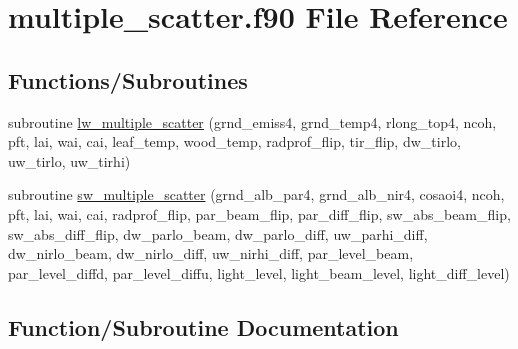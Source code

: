 \hypertarget{multiple__scatter_8f90}{}\section{multiple\+\_\+scatter.\+f90 File Reference}
\label{multiple__scatter_8f90}
\subsection*{Functions/\+Subroutines}
\begin{DoxyCompactItemize}
\item 
subroutine \hyperlink{multiple__scatter_8f90_a1369accc1269c7a9e612daad70493bc4}{lw\+\_\+multiple\+\_\+scatter} (grnd\+\_\+emiss4, grnd\+\_\+temp4, rlong\+\_\+top4, ncoh, pft, lai, wai, cai, leaf\+\_\+temp, wood\+\_\+temp, radprof\+\_\+flip, tir\+\_\+flip, dw\+\_\+tirlo, uw\+\_\+tirlo, uw\+\_\+tirhi)
\item 
subroutine \hyperlink{multiple__scatter_8f90_a6388f60b78ad37f8864f30cfd6a3cf62}{sw\+\_\+multiple\+\_\+scatter} (grnd\+\_\+alb\+\_\+par4, grnd\+\_\+alb\+\_\+nir4, cosaoi4, ncoh, pft, lai, wai, cai, radprof\+\_\+flip, par\+\_\+beam\+\_\+flip, par\+\_\+diff\+\_\+flip, sw\+\_\+abs\+\_\+beam\+\_\+flip, sw\+\_\+abs\+\_\+diff\+\_\+flip, dw\+\_\+parlo\+\_\+beam, dw\+\_\+parlo\+\_\+diff, uw\+\_\+parhi\+\_\+diff, dw\+\_\+nirlo\+\_\+beam, dw\+\_\+nirlo\+\_\+diff, uw\+\_\+nirhi\+\_\+diff, par\+\_\+level\+\_\+beam, par\+\_\+level\+\_\+diffd, par\+\_\+level\+\_\+diffu, light\+\_\+level, light\+\_\+beam\+\_\+level, light\+\_\+diff\+\_\+level)
\end{DoxyCompactItemize}


\subsection{Function/\+Subroutine Documentation}
\mbox{\label{multiple__scatter_8f90_a1369accc1269c7a9e612daad70493bc4}} 
